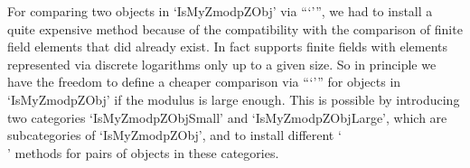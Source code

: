 For comparing two objects in `IsMyZmodpZObj' via ```\<''',
we had to install a quite expensive method because of the compatibility
with the comparison of finite field elements that did already exist.
In fact {\GAP} supports finite fields with elements represented via
discrete logarithms only up to a given size.
So in principle we have the freedom to define a cheaper comparison
via ```\<''' for objects in `IsMyZmodpZObj' if the modulus is large
enough.
This is possible by introducing two categories `IsMyZmodpZObjSmall'
and `IsMyZmodpZObjLarge', which are subcategories of `IsMyZmodpZObj',
and to install different `\\\<' methods for pairs of objects
in these categories.



